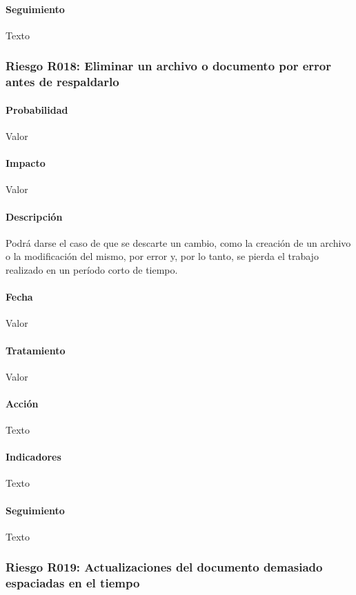 \documentclass[10pt,a4paper]{article}
\begin{document}
				\paragraph{Seguimiento}	Texto %
				\subsubsection{Riesgo R018: Eliminar un archivo o documento por error antes de respaldarlo}
				\paragraph{Probabilidad} Valor
				\paragraph{Impacto}	Valor
				\paragraph{Descripción} Podrá darse el caso de que se descarte un cambio, como la creación de un archivo o la modificación del mismo, por error y, por lo tanto, se pierda el trabajo realizado en un período corto de tiempo.
				\paragraph{Fecha} Valor %
				\paragraph{Tratamiento} Valor %
				\paragraph{Acción} Texto %
				\paragraph{Indicadores} Texto %
				\paragraph{Seguimiento}	Texto %
				\subsubsection{Riesgo R019: Actualizaciones del documento demasiado espaciadas en el tiempo}
\end{document}
